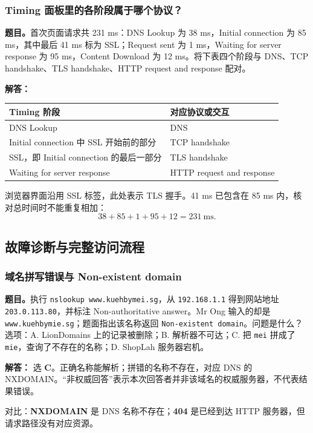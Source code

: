 \documentclass[11pt,a4paper,fontset=fandol]{ctexart}
\renewcommand{\exercisequestion}[2]{%
  \Needspace{5\baselineskip}%
  \subsubsection{#2}\label{exercise:#1}%
}
\renewenvironment{checkedsolution}
  {\par\nopagebreak[4]\textbf{解答：}\ignorespaces}
  {\par}
\begin{document}
\exercisequestion{SC2008-HW06-Q14}{Timing 面板里的各阶段属于哪个协议？}
\textbf{题目。}首次页面请求共 231 ms：DNS Lookup 为 38 ms，Initial connection 为 85 ms，其中最后 41 ms 标为 SSL；Request sent 为 1 ms，Waiting for server response 为 95 ms，Content Download 为 12 ms。将下表四个阶段与 DNS、TCP handshake、TLS handshake、HTTP request and response 配对。
\begin{checkedsolution}
\begin{center}
\small
\begin{tabularx}{\linewidth}{@{}X l@{}}
\toprule
Timing 阶段 & 对应协议或交互 \\
\midrule
DNS Lookup & DNS \\
Initial connection 中 SSL 开始前的部分 & TCP handshake \\
SSL，即 Initial connection 的最后一部分 & TLS handshake \\
Waiting for server response & HTTP request and response \\
\bottomrule
\end{tabularx}
\end{center}
浏览器界面沿用 SSL 标签，此处表示 TLS 握手。41 ms 已包含在 85 ms 内，核对总时间时不能重复相加：
\[
38+85+1+95+12=231\ \mathrm{ms}.
\]
\end{checkedsolution}

\subsection{故障诊断与完整访问流程}

\exercisequestion{SC2008-HW06-Q15}{域名拼写错误与 Non-existent domain}
\textbf{题目。}执行 \texttt{nslookup www.kuehbymei.sg}，从 \texttt{192.168.1.1} 得到网站地址 \texttt{203.0.113.80}，并标注 Non-authoritative answer。Mr Ong 输入的却是 \texttt{www.kuehbymie.sg}；题面指出该名称返回 \texttt{Non-existent domain}。问题是什么？
选项：A. LionDomains 上的记录被删除；B. 解析器不可达；C. 把 \texttt{mei} 拼成了 \texttt{mie}，查询了不存在的名称；D. ShopLah 服务器宕机。
\begin{checkedsolution}
选 \textbf{C}。正确名称能解析；拼错的名称不存在，对应 DNS 的 NXDOMAIN。“非权威回答”表示本次回答者并非该域名的权威服务器，不代表结果错误。

对比：\textbf{NXDOMAIN} 是 DNS 名称不存在；\textbf{404} 是已经到达 HTTP 服务器，但请求路径没有对应资源。
\end{checkedsolution}
\end{document}
